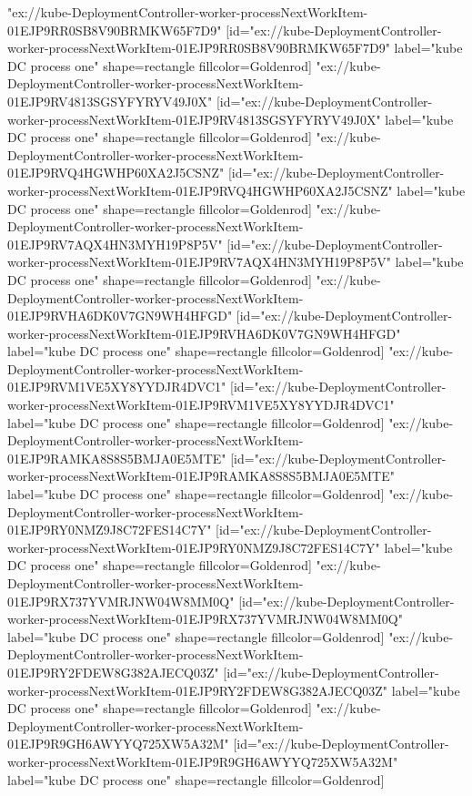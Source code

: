 {"ex://kube-DeploymentController-worker-processNextWorkItem-01EJP9RR0SB8V90BRMKW65F7D9" [id="ex://kube-DeploymentController-worker-processNextWorkItem-01EJP9RR0SB8V90BRMKW65F7D9" label="kube DC process one" shape=rectangle fillcolor=Goldenrod]
"ex://kube-DeploymentController-worker-processNextWorkItem-01EJP9RV4813SGSYFYRYV49J0X" [id="ex://kube-DeploymentController-worker-processNextWorkItem-01EJP9RV4813SGSYFYRYV49J0X" label="kube DC process one" shape=rectangle fillcolor=Goldenrod]
"ex://kube-DeploymentController-worker-processNextWorkItem-01EJP9RVQ4HGWHP60XA2J5CSNZ" [id="ex://kube-DeploymentController-worker-processNextWorkItem-01EJP9RVQ4HGWHP60XA2J5CSNZ" label="kube DC process one" shape=rectangle fillcolor=Goldenrod]
"ex://kube-DeploymentController-worker-processNextWorkItem-01EJP9RV7AQX4HN3MYH19P8P5V" [id="ex://kube-DeploymentController-worker-processNextWorkItem-01EJP9RV7AQX4HN3MYH19P8P5V" label="kube DC process one" shape=rectangle fillcolor=Goldenrod]
"ex://kube-DeploymentController-worker-processNextWorkItem-01EJP9RVHA6DK0V7GN9WH4HFGD" [id="ex://kube-DeploymentController-worker-processNextWorkItem-01EJP9RVHA6DK0V7GN9WH4HFGD" label="kube DC process one" shape=rectangle fillcolor=Goldenrod]
"ex://kube-DeploymentController-worker-processNextWorkItem-01EJP9RVM1VE5XY8YYDJR4DVC1" [id="ex://kube-DeploymentController-worker-processNextWorkItem-01EJP9RVM1VE5XY8YYDJR4DVC1" label="kube DC process one" shape=rectangle fillcolor=Goldenrod]
"ex://kube-DeploymentController-worker-processNextWorkItem-01EJP9RAMKA8S8S5BMJA0E5MTE" [id="ex://kube-DeploymentController-worker-processNextWorkItem-01EJP9RAMKA8S8S5BMJA0E5MTE" label="kube DC process one" shape=rectangle fillcolor=Goldenrod]
"ex://kube-DeploymentController-worker-processNextWorkItem-01EJP9RY0NMZ9J8C72FES14C7Y" [id="ex://kube-DeploymentController-worker-processNextWorkItem-01EJP9RY0NMZ9J8C72FES14C7Y" label="kube DC process one" shape=rectangle fillcolor=Goldenrod]
"ex://kube-DeploymentController-worker-processNextWorkItem-01EJP9RX737YVMRJNW04W8MM0Q" [id="ex://kube-DeploymentController-worker-processNextWorkItem-01EJP9RX737YVMRJNW04W8MM0Q" label="kube DC process one" shape=rectangle fillcolor=Goldenrod]
"ex://kube-DeploymentController-worker-processNextWorkItem-01EJP9RY2FDEW8G382AJECQ03Z" [id="ex://kube-DeploymentController-worker-processNextWorkItem-01EJP9RY2FDEW8G382AJECQ03Z" label="kube DC process one" shape=rectangle fillcolor=Goldenrod]
"ex://kube-DeploymentController-worker-processNextWorkItem-01EJP9R9GH6AWYYQ725XW5A32M" [id="ex://kube-DeploymentController-worker-processNextWorkItem-01EJP9R9GH6AWYYQ725XW5A32M" label="kube DC process one" shape=rectangle fillcolor=Goldenrod]
}
